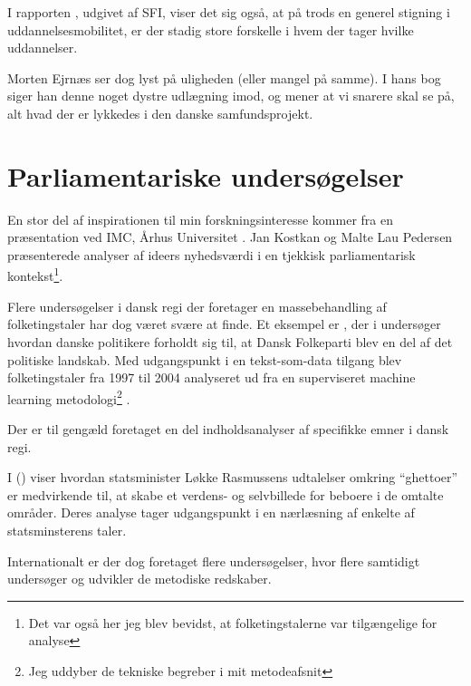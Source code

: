 I rapporten , udgivet af SFI, viser det sig også, at på trods en generel stigning i uddannelsesmobilitet, er der stadig store forskelle i hvem der tager hvilke uddannelser.

Morten Ejrnæs ser dog lyst på uligheden (eller mangel på samme).
I hans bog siger han denne noget dystre udlægning imod, og mener at vi snarere skal se på, alt hvad der er lykkedes i den danske samfundsprojekt.

\section{Parliamentariske undersøgelser}\label{sec:review-parl}

En stor del af inspirationen til min forskningsinteresse kommer fra en præsentation ved IMC, Århus Universitet \autocite{interactingmindscentreaarhusuniversityNLPWorkshopIMC2019}. Jan Kostkan og Malte Lau Pedersen præsenterede analyser af ideers nyhedsværdi i en tjekkisk parliamentarisk kontekst\footnote{Det var også her jeg blev bevidst, at folketingstalerne var tilgængelige for analyse}.

Flere undersøgelser i dansk regi der foretager en massebehandling af folketingstaler har dog været svære at finde.
Et eksempel er \citeauthor{hjorthEstablishmentResponsesPopulist2018}, der i  undersøger hvordan danske politikere forholdt sig til, at Dansk Folkeparti blev en del af det politiske landskab.
Med udgangspunkt i en tekst-som-data tilgang blev folketingstaler fra 1997 til 2004 analyseret ud fra en superviseret machine learning metodologi\footnote{Jeg uddyber de tekniske begreber i mit metodeafsnit} \autocite{hjorthEstablishmentResponsesPopulist2018}.

Der er til gengæld foretaget en del indholdsanalyser af specifikke emner i dansk regi.

I  (\citeyear{andersenTaenkIkkePa2012}) viser \citeauthor{andersenTaenkIkkePa2012} hvordan statsminister Løkke Rasmussens udtalelser omkring “ghettoer” er medvirkende til, at skabe et verdens- og selvbillede for beboere i de omtalte områder.
Deres analyse tager udgangspunkt i en nærlæsning af enkelte af statsminsterens taler.

Internationalt er der dog foretaget flere undersøgelser, hvor flere samtidigt undersøger og udvikler de metodiske redskaber.


